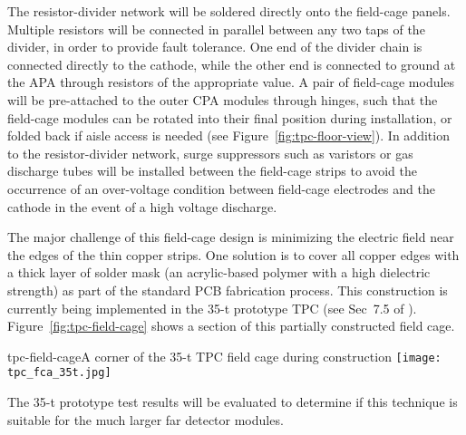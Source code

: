 The resistor-divider network will be soldered directly onto the
field-cage panels. Multiple resistors will be connected in parallel
between any two taps of the divider, in order to provide fault
tolerance.  One end of the divider chain is connected directly to the
cathode, while the other end is connected to ground at the APA through
resistors of the appropriate value.  A pair of field-cage modules will
be pre-attached to the outer CPA modules through hinges, such that the
field-cage modules can be rotated into their final position during
installation, or folded back if aisle access is needed (see
Figure~\ref{fig:tpc-floor-view}).  In addition to the resistor-divider
network, surge suppressors such as varistors or gas discharge tubes
will be installed between the field-cage strips to avoid the
occurrence of an over-voltage condition between field-cage electrodes
and the cathode in the event of a high voltage discharge.

The major challenge of this field-cage design is minimizing the
electric field near the edges of the thin copper strips.  One solution
is to cover all copper edges with a thick layer of solder mask (an
acrylic-based polymer with a high dielectric strength) as part of the
standard PCB fabrication process.  This construction is currently
being implemented in the 35-t prototype TPC (see Sec~7.5 of
\anxlbnefd).  Figure~\ref{fig:tpc-field-cage} shows a section of this
partially constructed field cage.
\begin{cdrfigure}{tpc-field-cage}{A corner of the 35-t TPC 
field cage during construction}
\texttt{[image: tpc\_fca\_35t.jpg]}
\end{cdrfigure}
The 35-t prototype test results will be evaluated to determine if this
technique is suitable for the much larger far detector modules.
 
